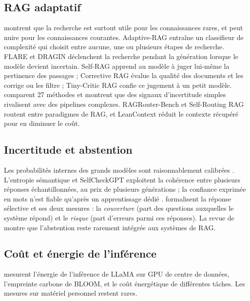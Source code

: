 \documentclass[11pt,a4paper]{article}
\begin{document}
\subsection{RAG adaptatif}

\citet{mallen2022trust} montrent que la recherche est surtout utile pour les connaissances rares, et
peut nuire pour les connaissances courantes. Adaptive-RAG \citep{jeong2024adaptiverag} entraîne un
classifieur de complexité qui choisit entre aucune, une ou plusieurs étapes de recherche. FLARE
\citep{jiang2023flare} et DRAGIN \citep{su2024dragin} déclenchent la recherche pendant la génération
lorsque le modèle devient incertain. Self-RAG \citep{asai2023selfrag} apprend au modèle à juger
lui-même la pertinence des passages ; Corrective RAG \citep{yan2024crag} évalue la qualité des documents
et les corrige ou les filtre ; Tiny-Critic RAG \citep{wu2026tinycritic} confie ce jugement à un petit
modèle. \citet{moskvoretskii2025adaptive} comparent 27 méthodes et montrent que des signaux
d'incertitude simples rivalisent avec des pipelines complexes. RAGRouter-Bench
\citep{wang2026ragrouterbench} et Self-Routing RAG \citep{wu2025srrag} routent entre paradigmes de RAG,
et LeanContext \citep{arefeen2024leancontext} réduit le contexte récupéré pour en diminuer le coût.

\subsection{Incertitude et abstention}

Les probabilités internes des grands modèles sont raisonnablement calibrées \citep{kadavath2022know}.
L'entropie sémantique \citep{kuhn2023semantic} et SelfCheckGPT \citep{manakul2023selfcheckgpt} exploitent
la cohérence entre plusieurs réponses échantillonnées, au prix de plusieurs générations ; la confiance
exprimée en mots n'est fiable qu'après un apprentissage dédié \citep{lin2022verbal}.
\citet{kamath2020selective} formalisent la réponse sélective et ses deux mesures : la \emph{couverture}
(part des questions auxquelles le système répond) et le \emph{risque} (part d'erreurs parmi ces
réponses). La revue de \citet{wen2024abstention} montre que l'abstention reste rarement intégrée aux
systèmes de RAG.

\subsection{Coût et énergie de l'inférence}

\citet{samsi2023watts} mesurent l'énergie de l'inférence de LLaMA sur GPU de centre de données,
\citet{luccioni2022bloom} l'empreinte carbone de BLOOM, et \citet{luccioni2024power} le coût énergétique
de différentes tâches. Les mesures sur matériel personnel restent rares.
\end{document}
